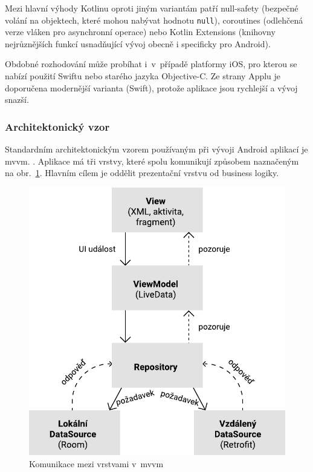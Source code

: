 \documentclass[a4paper,11pt,openany,twoside]{book}
\begin{document}
Mezi hlavní výhody Kotlinu oproti jiným variantám patří null-safety (bezpečné volání na objektech, které mohou nabývat hodnotu \texttt{null}), coroutines (odlehčená verze vláken pro asynchronní operace) nebo Kotlin Extensions (knihovny nejrůznějších funkcí usnadňující vývoj obecně i specificky pro Android). \cite{android2021kotlin}

Obdobné rozhodování může probíhat i~v~případě platformy iOS, pro kterou se nabízí použití Swiftu nebo starého jazyka Objective-C. Ze strany Applu je doporučena modernější varianta (Swift), protože aplikace jsou rychlejší a vývoj snazší.

\subsubsection{Architektonický vzor}
Standardním architektonickým vzorem používaným při vývoji Android aplikací je \acs{mvvm}. \cite{android2020guide}. Aplikace má tři vrstvy, které spolu komunikují způsobem naznačeným na obr.~\ref{fig:mvvm}. Hlavním cílem je oddělit prezentační vrstvu od business logiky.  \cite{shekhar2020mvvm}

\begin{figure}[h!]
	\centering
	\includegraphics[scale=0.7]{img/mvvm-architecture.pdf}
	\caption{Komunikace mezi vrstvami v~\acs{mvvm}}
	\label{fig:mvvm}
\end{figure}
\end{document}
